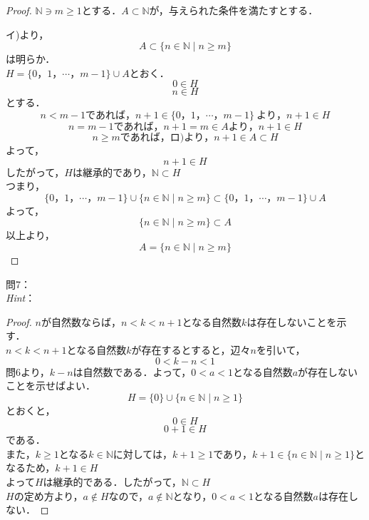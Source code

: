 \documentclass[dvipdfmx,uplatex,11pt]{jsarticle}
\theoremstyle{definition}
\begin{document}
\begin{leftbar}
	\begin{proof}
		$\mathbb{N} \ni m \ge 1$とする．$A \subset \mathbb{N}$が，与えられた条件を満たすとする．\par
		イ)より，
		\[ A \subset \{n \in \mathbb{N} \mid n \ge m\} \]
		は明らか．\\
		$H=\{0，1，\cdots，m-1\} \cup A$とおく．
		\begin{equation}
			0 \in H
		\end{equation}
		\begin{equation}
			n \in H
		\end{equation}
		とする．\\
		\[ n<m-1であれば，n+1 \in \{0，1，\cdots，m-1\}~より，n+1 \in H \]
		\[ n=m-1であれば，n+1=m \in Aより，n+1 \in H\]
		\[ n \ge mであれば，ロ)より，n+1 \in A \subset H \]
		よって，
		\[
			n+1 \in H
		\]
		したがって，$H$は継承的であり，$\mathbb{N} \subset H$\\
		つまり，\\
		\[
			\{0，1，\cdots，m-1\} \cup \{n \in \mathbb{N} \mid n \ge m \} \subset \{0，1，\cdots，m-1\} \cup A
		\]
		よって，
		\[
			\{n \in \mathbb{N}\mid n \ge m \} \subset A
		\]
		以上より，
		\[
			A=\{n \in \mathbb{N} \mid n \ge m\}
		\]
	\end{proof}
\end{leftbar}
%
\newpage
%
\noindent
問7：
\\
\textsl{Hint}：\\
\dotfill
%
\begin{leftbar}
	\begin{proof}
		$n$が自然数ならば，$n <k <n+1$となる自然数$k$は存在しないことを示す．\\
		$n < k < n+1$となる自然数$k$が存在するとすると，辺々$n$を引いて，
		\[ 0 < k - n < 1 \]
		問6より，$k-n$は自然数である．よって，$0<a<1$となる自然数$a$が存在しないことを示せばよい．\\
		\[ H=\{0\} \cup \{n \in \mathbb{N} \mid n \ge 1 \} \]
		とおくと，
		\begin{equation}
			0 \in H
		\end{equation}
		\begin{equation}
			0+1 \in H
		\end{equation}
		である．\\
		また，$k \ge 1$となる$k \in \mathbb{N}$に対しては，$k +1 \ge 1$であり，$k+1 \in \{n \in \mathbb{N} \mid n \ge 1 \} $となるため，$k+1 \in H$\\
		よって$H$は継承的である．したがって，$\mathbb{N} \subset H$\\
		$H$の定め方より，$a \notin H$なので，$a \notin \mathbb{N}$となり，$0<a<1$となる自然数$a$は存在しない．
	\end{proof}
\end{leftbar}
%
\newpage
%
\setcounter{equation}{0}
\end{document}
